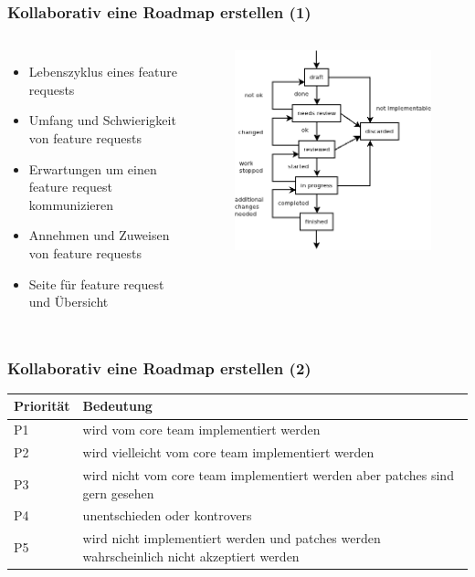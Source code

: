 \documentclass{beamer}
\begin{document}
\begin{frame}
\frametitle{Kollaborativ eine Roadmap erstellen (1)}
\begin{columns}
  \begin{itemize}
   \item Lebenszyklus eines feature requests
   \item Umfang und Schwierigkeit von feature requests
   \item Erwartungen um einen feature request kommunizieren
   \item Annehmen und Zuweisen von feature requests
   \item Seite f\"ur feature request und \"Ubersicht
  \end{itemize}
  \begin{figure}[h!]
   \centering
   \includegraphics[scale=0.4,keepaspectratio=true]{./featurerequeststates.png}
  \end{figure}
\end{columns}
\end{frame}

\begin{frame}
\frametitle{Kollaborativ eine Roadmap erstellen (2)}
\begin{table}[h]
\begin{tabular}{|p{}|p{}|}
\hline
Priorit\"at & Bedeutung\\
\hline \hline
P1 & wird vom core team implementiert werden\\
\hline
P2 & wird vielleicht vom core team implementiert werden\\
\hline
P3 & wird nicht vom core team implementiert werden aber patches sind gern gesehen\\
\hline
P4 & unentschieden oder kontrovers\\
\hline
P5 & wird nicht implementiert werden und patches werden wahrscheinlich nicht akzeptiert werden\\
\hline
\end{tabular}
\centering
\end{table}
\end{frame}
\end{document}
